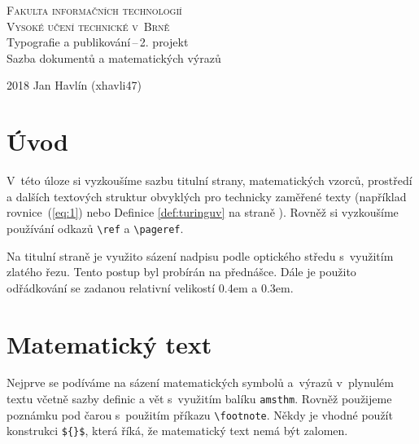 \documentclass[11pt,twocolumn,a4paper]{article}
\theoremstyle{definition}
\theoremstyle{plain}
\begin{document}
\begin{titlepage}
\begin{center}
	\Huge
	\textsc{Fakulta informačních technologií} \\
	\textsc{Vysoké učení technické v~Brně}\\
	\LARGE
	Typografie a publikování\,--\,2. projekt \\
	Sazba dokumentů a matematických výrazů
\end{center}
{\Large 2018 \hfill Jan Havlín (xhavli47)}
\end{titlepage}

\section*{Úvod}
V~této úloze si vyzkoušíme sazbu titulní strany, matematických vzorců, prostředí a dalších textových struktur obvyklých pro technicky zaměřené texty (například rovnice~(\ref{eq:1}) nebo Definice \ref{def:turinguv} na straně \pageref{def:turinguv}). Rovněž si vyzkoušíme používání odkazů \verb|\ref| a \verb|\pageref|.\par Na titulní straně je využito sázení nadpisu podle optického středu s~využitím zlatého řezu. Tento postup byl probírán na přednášce. Dále je použito odřádkování se zadanou relativní velikostí 0.4em a 0.3em.

\section{Matematický text}
Nejprve se podíváme na sázení matematických symbolů a~výrazů v~plynulém textu včetně sazby definic a vět s~využitím balíku \texttt{amsthm}. Rovněž použijeme poznámku pod čarou s~použitím příkazu \verb|\footnote|. Někdy je vhodné použít konstrukci \verb|${}$|, která říká, že matematický text nemá být zalomen.\par 
\end{document}
